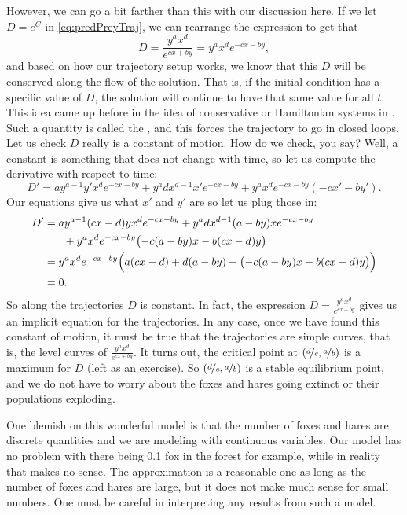 However, we can go a bit farther than this with our discussion here. If we let $D = e^C$ in \eqref{eq:predPreyTraj}, we can rearrange the expression to get that 
\begin{equation*}
D = \frac{y^a x^d}{e^{cx+by}} = y^a x^d e^{-cx-by},
\end{equation*}
and based on how our trajectory setup works, we know that this $D$ will be conserved along the flow of the solution. That is, if the initial condition has a specific value of $D$, the solution will continue to have that same value for all $t$. This idea came up before in the idea of conservative or Hamiltonian systems in . Such a quantity is called the \emph{}, and this forces the trajectory to go in closed loops.  Let us check $D$ really is a constant of motion.  How do we check, you say?  Well, a constant is
something that does not change with time, so let us compute the derivative
with respect to time:
\begin{equation*}
D' = 
a y^{a-1}y' x^d e^{-cx-by}
+
y^a d x^{d-1} x' e^{-cx-by}
+
y^a x^d e^{-cx-by} (-cx'-by') .
\end{equation*}
Our equations give us what $x'$ and $y'$ are so let us plug those in:
\begin{equation*}
\begin{split}
D' & = 
a y^{a-1} (cx-d)y x^d e^{-cx-by}
+
y^a d x^{d-1} (a-by)x e^{-cx-by}
\\
& \phantom{mm} +
y^a x^d e^{-cx-by} \bigl(-c(a-by)x-b(cx-d)y\bigr)
\\
& =
y^a x^d e^{-cx-by}
\Bigl(
a (cx-d)
+
d (a-by)
+
\bigl(-c(a-by)x-b(cx-d)y\bigr) \Bigr)
\\
& = 
0 .
\end{split}
\end{equation*}
So along the trajectories $D$ is constant.  In fact, the expression $D =
\frac{y^a x^d}{e^{cx+by}}$ gives us an implicit equation for the
trajectories.  In any case, once we have found this constant of motion,
it must be true that the
trajectories are simple curves, that is, the level curves of
$\frac{y^a x^d}{e^{cx+by}}$.  It turns out, the critical point at
$(\nicefrac{d}{c},\nicefrac{a}{b})$ is a maximum for $D$ (left as an exercise).
So $(\nicefrac{d}{c},\nicefrac{a}{b})$ is a stable equilibrium point, and 
we do not have to worry about the foxes and hares going extinct or their
populations exploding.

One blemish on this wonderful model is that the number of foxes and hares
are discrete quantities and we are modeling with continuous variables.  Our
model has no problem with there being 0.1 fox in the forest for example,
while in reality that makes no sense.  The approximation is a reasonable one
as long as the number of foxes and hares are large, but it does not make
much sense for small numbers.  One must be careful in interpreting any
results from such a model.


